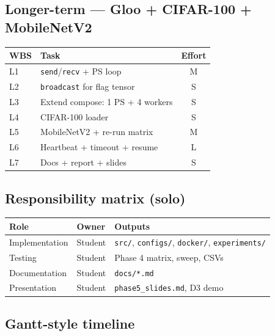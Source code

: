 \documentclass[11pt,a4paper]{article}
\begin{document}
\subsection{Longer-term --- Gloo + CIFAR-100 + MobileNetV2}

\begin{table}[htbp]
  \centering
  \small
  \begin{tabularx}{\linewidth}{@{}l L c@{}}
    \toprule
    \textbf{WBS} & \textbf{Task} & \textbf{Effort} \\
    \midrule
    L1 & \texttt{send}/\texttt{recv} + PS loop & M \\
    L2 & \texttt{broadcast} for flag tensor & S \\
    L3 & Extend compose: 1 PS + 4 workers & S \\
    L4 & CIFAR-100 loader & S \\
    L5 & MobileNetV2 + re-run matrix & M \\
    L6 & Heartbeat + timeout + resume & L \\
    L7 & Docs + report + slides & S \\
    \bottomrule
  \end{tabularx}
\end{table}

\subsection{Responsibility matrix (solo)}

\begin{table}[htbp]
  \centering
  \begin{tabularx}{\linewidth}{@{}l L L@{}}
    \toprule
    \textbf{Role} & \textbf{Owner} & \textbf{Outputs} \\
    \midrule
    Implementation & Student & \texttt{src/}, \texttt{configs/}, \texttt{docker/}, \texttt{experiments/} \\
    Testing & Student & Phase 4 matrix, sweep, CSVs \\
    Documentation & Student & \texttt{docs/*.md} \\
    Presentation & Student & \texttt{phase5\_slides.md}, D3 demo \\
    \bottomrule
  \end{tabularx}
\end{table}

\subsection{Gantt-style timeline}
\end{document}
